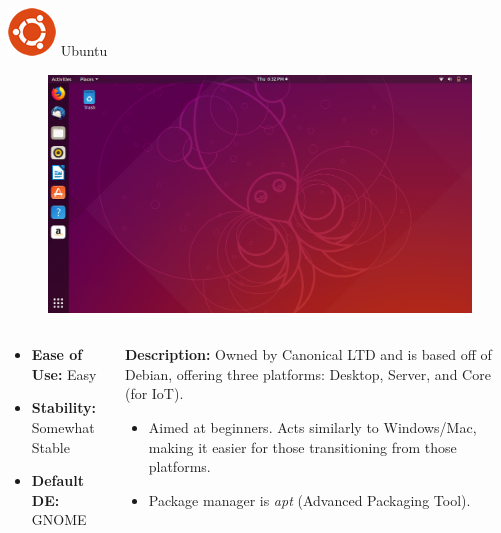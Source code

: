 \documentclass[11pt]{beamer}
\begin{document}
\begin{frame}{\includegraphics[scale=0.3]{ubuntu-logo.png} Ubuntu}
	\begin{figure}
		\includegraphics[scale=0.15]{ubuntu-screenshot.png}
	\end{figure}
	\begin{columns}
		\small
		\begin{column}{0.35\textwidth}
			\begin{itemize}
				\item \textbf{Ease of Use:} Easy
				\item \textbf{Stability:} Somewhat Stable
				\item \textbf{Default DE:} GNOME
			\end{itemize}
		\end{column}
		\begin{column}{0.65\textwidth}
			\small
			\textbf{Description:} Owned by Canonical LTD and is based off of Debian, offering three platforms: Desktop, Server, and Core (for IoT).
			\begin{itemize}
				\item Aimed at beginners. Acts similarly to Windows/Mac, making it easier for those transitioning from those platforms.
				\item Package manager is \textit{apt} (Advanced Packaging Tool).
			\end{itemize}
		\end{column}
	\end{columns}
\end{frame}
\end{document}
